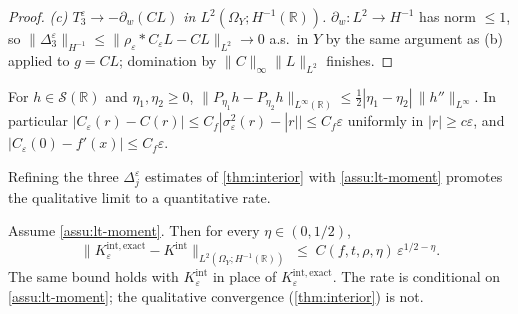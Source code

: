 \documentclass[EJP]{ejpecp}
\newcommand{\R}{\mathbb{R}}
\begin{document}
\begin{proof}
\emph{(c) $T_3^{\varepsilon}\to-\partial_w(CL)$ in
$L^{2}(\Omega_Y;H^{-1}(\R))$.}
$\partial_w\colon L^{2}\to H^{-1}$ has norm $\le 1$, so
$\|\Delta_3^{\varepsilon}\|_{H^{-1}}\le\|\rho_\varepsilon*C_\varepsilon L-CL\|_{L^{2}}\to 0$
a.s.\ in $Y$ by the same argument as (b) applied to $g=CL$;
domination by $\|C\|_\infty\|L\|_{L^{2}}$ finishes.
\end{proof}

\begin{lemma}\label{lem:heat-rate}
For $h\in\mathscr S(\R)$ and $\eta_1,\eta_2\ge 0$,
$\|P_{\eta_1}h-P_{\eta_2}h\|_{L^{\infty}(\R)}\le\tfrac12|\eta_1-\eta_2|\,\|h''\|_{L^{\infty}}$.
In particular
$|C_\varepsilon(r)-C(r)|\le C_f|\sigma_\varepsilon^{2}(r)-|r||\le C_f\varepsilon$
uniformly in $|r|\ge c\varepsilon$, and
$|C_\varepsilon(0)-f'(x)|\le C_f\varepsilon$.
\end{lemma}

Refining the three $\Delta_j^{\varepsilon}$ estimates of
\cref{thm:interior} with \cref{assu:lt-moment} promotes the
qualitative limit to a quantitative rate.

\begin{proposition}\label{prop:interior-rate}
Assume \cref{assu:lt-moment}. Then for every $\eta\in(0,1/2)$,
\begin{equation}\label{eq:int-rate}
 \bigl\|K_{\varepsilon}^{\mathrm{int,exact}}-K^{\mathrm{int}}\bigr\|_{L^{2}(\Omega_{Y};H^{-1}(\R))}
 \;\le\;C(f,t,\rho,\eta)\,\varepsilon^{1/2-\eta}.
\end{equation}
The same bound holds with $K_\varepsilon^{\mathrm{int}}$ in place
of $K_\varepsilon^{\mathrm{int,exact}}$. The rate is conditional on
\cref{assu:lt-moment}; the qualitative convergence
(\cref{thm:interior}) is not.
\end{proposition}
\end{document}
